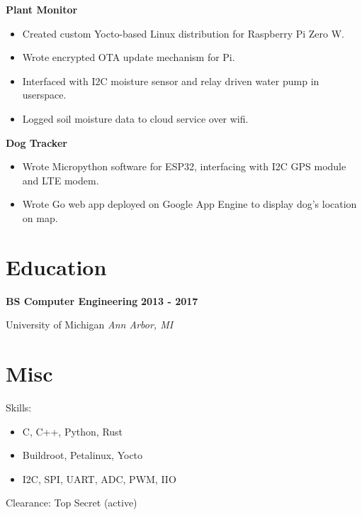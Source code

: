 \documentclass{article}
\newcommand{\experience}[4]{
    \noindent \textbf{#1} \hfill \textbf{#2} \par
    \noindent #3 \hfill \textit{#4} \par
}
\begin{document}
        \noindent \textbf{Plant Monitor}
        \begin{itemize}
            \item Created custom Yocto-based Linux distribution for Raspberry Pi Zero W.
            \item Wrote encrypted OTA update mechanism for Pi.
            \item Interfaced with I2C moisture sensor and relay driven water pump in userspace.
            \item Logged soil moisture data to cloud service over wifi.
        \end{itemize}

        \noindent \textbf{Dog Tracker}
        \begin{itemize}
            \item Wrote Micropython software for ESP32, interfacing with I2C GPS module and LTE modem.
            \item Wrote Go web app deployed on Google App Engine to display dog's location on map.
        \end{itemize}

    \section*{Education}
        \experience{BS Computer Engineering}{2013 - 2017}{University of Michigan}{Ann Arbor, MI}

    \section*{Misc}
        \noindent Skills:
        \begin{itemize}
            \item C, C++, Python, Rust
            \item Buildroot, Petalinux, Yocto
            \item I2C, SPI, UART, ADC, PWM, IIO
        \end{itemize}
        \noindent Clearance: Top Secret (active) \par
\end{document}
